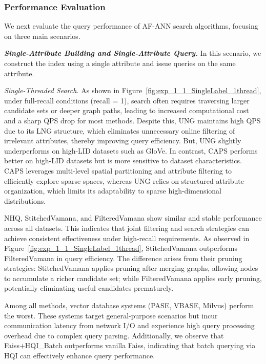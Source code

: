\documentclass[sigconf, nonacm]{acmart}
\begin{document}
\begin{sloppypar}
\subsubsection{Performance Evaluation}




We next evaluate the query performance of AF-ANN search algorithms, focusing on three main scenarios.

\textit{\textbf{Single-Attribute Building and Single-Attribute Query.}}
In this scenario, we construct the index using a single attribute and issue queries on the same attribute.

\textit{Single-Threaded Search.}  
As shown in Figure~\ref{fig:exp_1_1_SingleLabel_1thread}, under full-recall conditions (recall = 1), search often requires traversing larger candidate sets or deeper graph paths, leading to increased computational cost and a sharp QPS drop for most methods. Despite this, UNG maintains high QPS due to its LNG structure, which eliminates unnecessary online filtering of irrelevant attributes, thereby improving query efficiency. But, UNG slightly underperforms on high-LID datasets such as GloVe. In contrast, CAPS performs better on high-LID datasets but is more sensitive to dataset characteristics. CAPS leverages multi-level spatial partitioning and attribute filtering to efficiently explore sparse spaces, whereas UNG relies on structured attribute organization, which limits its adaptability to sparse high-dimensional distributions.



NHQ, StitchedVamana, and FilteredVamana show similar and stable performance across all datasets. This indicates that joint filtering and search strategies can achieve consistent effectiveness under high-recall requirements. As observed in Figure~\ref{fig:exp_1_1_SingleLabel_1thread}, StitchedVamana outperforms FilteredVamana in query efficiency. The difference arises from their pruning strategies: StitchedVamana applies pruning after merging graphs, allowing nodes to accumulate a richer candidate set; while FilteredVamana applies early pruning, potentially eliminating useful candidates prematurely.

Among all methods, vector database systems (PASE, VBASE, Milvus) perform the worst. These systems target general-purpose scenarios but incur communication latency from network I/O and experience high query processing overhead due to complex query parsing. Additionally, we observe that Faiss+HQI\_Batch outperforms vanilla Faiss, indicating that batch querying via HQI can effectively enhance query performance.


\end{sloppypar}
\end{document}
